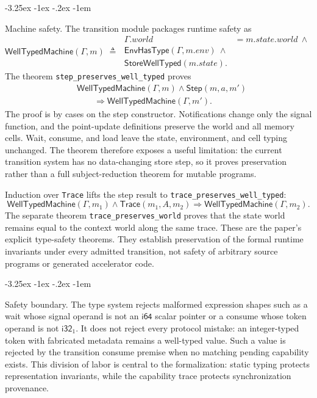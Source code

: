 \documentclass[a4paper,USenglish]{lipics-v2021}
\makeatletter
\renewcommand\paragraph{\@startsection{paragraph}{4}{\z@}%
  {-3.25ex \@plus -1ex \@minus -.2ex}%
  {-1em}%
  {\sffamily\large\bfseries\raggedright}}
\makeatother
\begin{document}
\paragraph{Machine safety.}
The transition module packages runtime safety as
\[
\mathsf{WellTypedMachine}(\Gamma,m) \;\triangleq\;
 \begin{aligned}
 \Gamma.world &= m.state.world\ \land\\
 \mathsf{EnvHasType}(\Gamma,m.env)\ \land\\
 \mathsf{StoreWellTyped}(m.state).
 \end{aligned}
\]
The theorem \texttt{step\_preserves\_well\_typed} proves
\[
 \begin{aligned}
 &\mathsf{WellTypedMachine}(\Gamma,m)\land
   \mathsf{Step}(m,a,m') \\
 &\qquad\Longrightarrow
   \mathsf{WellTypedMachine}(\Gamma,m').
 \end{aligned}
\]
The proof is by cases on the step constructor. Notifications change only the
signal function, and the point-update definitions preserve the world and all
memory cells. Wait, consume, and load leave the state, environment, and cell
typing unchanged. The theorem therefore exposes a useful limitation: the
current transition system has no data-changing store step, so it proves
preservation rather than a full subject-reduction theorem for mutable programs.

Induction over \texttt{Trace} lifts the step result to
\texttt{trace\_preserves\_well\_typed}:
\[
 \mathsf{WellTypedMachine}(\Gamma,m_1)\land
 \mathsf{Trace}(m_1,A,m_2)
 \Longrightarrow
 \mathsf{WellTypedMachine}(\Gamma,m_2).
\]
The separate theorem \texttt{trace\_preserves\_world} proves that the state
world remains equal to the context world along the same trace. These are the
paper's explicit type-safety theorems. They establish preservation of the
formal runtime invariants under every admitted transition, not safety of
arbitrary source programs or generated accelerator code.

\paragraph{Safety boundary.}
The type system rejects malformed expression shapes such as a wait whose
signal operand is not an \(\mathsf{i64}\) scalar pointer or a consume whose
token operand is not \(\mathsf{i32}_1\). It does not reject every protocol
mistake: an integer-typed token with fabricated metadata remains a well-typed
value. Such a value is rejected by the transition consume premise when no
matching pending capability exists. This division of labor is central to the
formalization: static typing protects representation invariants, while the
capability trace protects synchronization provenance.
\end{document}
